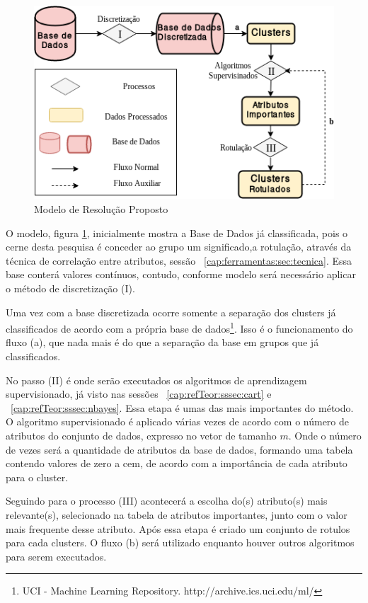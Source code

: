 \begin{figure}[h!]
        \centering
        \includegraphics[scale=0.7]{figs/modeloResolucao.png}
        \caption{Modelo de Resolução Proposto} \label{fig:modeloresolucao}
\end{figure}

O modelo, figura \ref{fig:modeloresolucao}, inicialmente mostra a Base de Dados  já classificada, pois o cerne desta pesquisa é conceder ao grupo um significado,a rotulação,  através da técnica de correlação entre atributos, sessão ~\ref{cap:ferramentas:sec:tecnica}. Essa base  conterá  valores contínuos, contudo, conforme modelo será necessário aplicar o método de discretização (I).

Uma vez com a base discretizada ocorre somente a separação dos clusters já classificados de acordo com a própria base de dados\footnote{UCI - Machine Learning Repository. http://archive.ics.uci.edu/ml/ }. Isso é o funcionamento do fluxo (a), que nada mais é do que a separação da base em grupos que já classificados.

No passo (II) é onde serão executados os algoritmos de aprendizagem supervisionado, já visto nas sessões ~\ref{cap:refTeor:sssec:cart} e ~\ref{cap:refTeor:sssec:nbayes}. Essa etapa é umas das mais importantes do método. O algoritmo supervisionado é aplicado várias vezes de acordo com o número de atributos do conjunto de dados, expresso no vetor de tamanho ${m}$. Onde o número de vezes será a quantidade de atributos da base de dados, formando uma tabela contendo valores de zero a cem, de acordo com a importância de cada atributo para o cluster.

Seguindo para o processo (III) acontecerá a escolha do(s) atributo(s) mais relevante(s), selecionado na tabela de atributos importantes, junto com o valor mais frequente desse atributo. Após essa etapa é criado um conjunto de rotulos para cada clusters. O fluxo (b) será utilizado enquanto houver outros algoritmos para serem executados.

